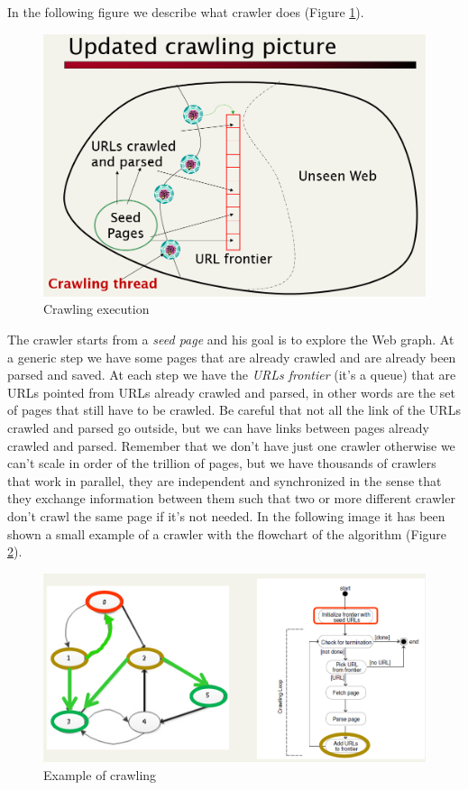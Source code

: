 In the following figure we describe what crawler does (Figure \ref{fig:crawlingexecution}).
\begin{figure}
    \centering
    \includegraphics[width=0.75\linewidth]{images/crawlingpicture.png}
    \caption{Crawling execution}
    \label{fig:crawlingexecution}
\end{figure}
The crawler starts from a \textit{seed page} and his goal is to explore the Web graph. At a generic step we have some pages that are already crawled and are already been parsed and saved. At each step we have the \textit{URLs frontier} (it's a queue) that are URLs pointed from URLs already crawled and parsed, in other words are the set of pages that still have to be crawled. Be careful that not all the link of the URLs crawled and parsed go outside, but we can have links between pages already crawled and parsed. Remember that we don't have just one crawler otherwise we can't scale in order of the trillion of pages, but we have thousands of crawlers that work in parallel, they are independent and synchronized in the sense that they exchange information between them such that two or more different crawler don't crawl the same page if it's not needed.\newline
In the following image it has been shown a small example of a crawler with the flowchart of the algorithm (Figure \ref{fig:crawlingexample}).
\begin{figure}
    \centering
    \includegraphics[width=0.75\linewidth]{images/crawlingexample.png}
    \caption{Example of crawling}
    \label{fig:crawlingexample}
\end{figure}
